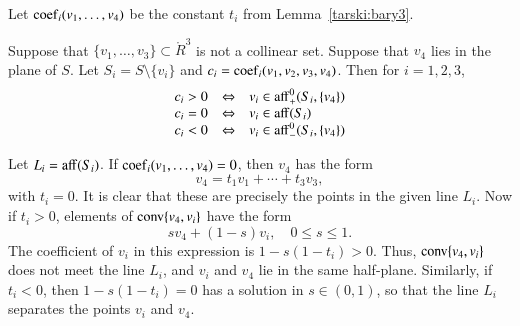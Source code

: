 \begin{tarskidata}
\begin{tarski}

\begin{definition}[coef] 
Let ${\operatorname{coef}}_i(v_1,\ldots,v_4)$
be the constant $t_i$ from Lemma~\ref{tarski:bary3}.
\end{definition}
\end{tarski}




\begin{tarski}

\begin{lemma}
Suppose
that $\{v_1,\ldots,v_3\}\subset\ring{R}^3$ is not a collinear
set. 
Suppose that $v_4$ lies in the plane of $S$.
Let $S_i = S\setminus \{v_i\}$ and $c_i = {\operatorname{coef}}_i(v_1,v_2,v_3,v_4)$. 
Then for $i=1,2,3$, 
   $$
   \begin{array}{lll}
     c_i > 0  & \Leftrightarrow & v_i \in {\operatorname{aff}}_+^0(S_i,\{v_4\})\\
     c_i = 0 & \Leftrightarrow & v_i \in {\operatorname{aff}}(S_i)\\
     c_i < 0 & \Leftrightarrow & v_i \in {\operatorname{aff}}_-^0(S_i,\{v_4\})\\
     \end{array}
   $$
\end{lemma}

\begin{proved}
  Let $L_i ={\operatorname{aff}}(S_i)$.
If ${\operatorname{coef}}_i(v_1,\ldots,v_4)=0$, then $v_4$
has the form
	$$
	v_4 = t_1 v_1 + \cdots + t_3 v_3,
	$$
with $t_i=0$.  It is clear that these are
precisely the points in the given line $L_i$.
Now if $t_i>0$,
elements of
${\operatorname{conv}}\{v_4,v_i\}$ have the form
	$$s v_4 + (1-s) v_i,\quad 0\le s \le 1.$$
The coefficient of $v_i$ in this expression
is $1-s(1-t_i)>0$.  Thus, ${\operatorname{conv}}\{v_4,v_i\}$
does not meet the line $L_i$, and $v_i$ and $v_4$
lie in the same half-plane.  Similarly,
if $t_i<0$, then $1-s(1-t_i)=0$ has a solution
in $s\in(0,1)$, so that the line $L_i$ separates the
points $v_i$ and $v_4$.
\swallowed\end{proved}
\end{tarski}





\end{tarskidata}
